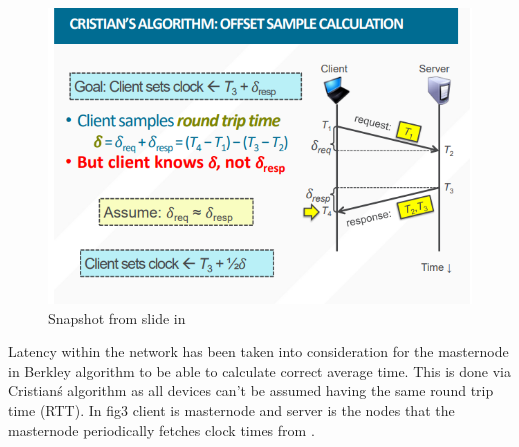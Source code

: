 \documentclass[article,a4paper]{IEEEtran}
\begin{document}
\begin{figure}
    \includegraphics[width=\columnwidth]{Cristianalgo.png} 
    \caption{ Snapshot from slide in \cite{Timesyncslides} }
    \label{fig3: Cristianalgo }   
\end{figure}  
\newline
Latency within the network has been taken into consideration for the masternode in Berkley algorithm to be able to calculate correct average time. This is done via Cristian\'s algorithm as all devices can't be assumed having the same round trip time (RTT). In fig3 client is masternode and server is the nodes that the masternode periodically fetches clock times from \cite{Christianalgo}.  
\end{document}
